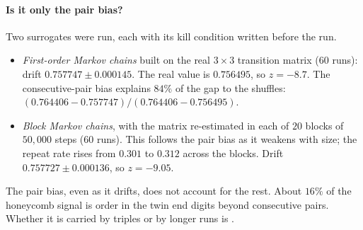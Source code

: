 
\paragraph{Is it only the pair bias?} 
Two surrogates were run, each with its kill condition written before the run.
\begin{itemize}
\item \emph{First-order Markov chains} built on the real $3\times3$ transition matrix (60 runs): drift $0.757747\pm0.000145$. The real value is $0.756495$, so $z=-8.7$. The consecutive-pair bias explains $84\%$ of the gap to the shuffles: $(0.764406-0.757747)/(0.764406-0.756495)$.
\item \emph{Block Markov chains}, with the matrix re-estimated in each of $20$ blocks of $50{,}000$ steps (60 runs). This follows the pair bias as it weakens with size; the repeat rate rises from $0.301$ to $0.312$ across the blocks. Drift $0.757727\pm0.000136$, so $z=-9.05$.
\end{itemize}
The pair bias, even as it drifts, does not account for the rest. About $16\%$ of the honeycomb signal is order in the twin end digits beyond consecutive pairs. Whether it is carried by triples or by longer runs is .
